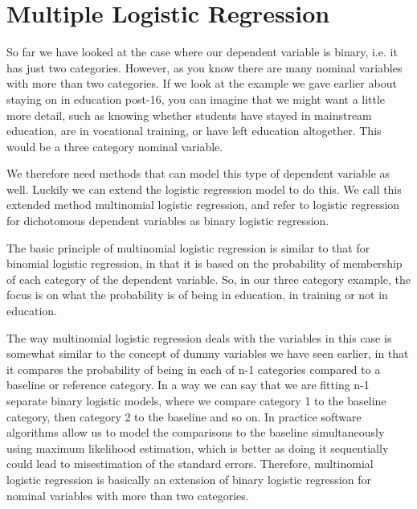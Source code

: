 \documentclass[a4paper,12pt]{article}
\begin{document}
\tableofcontents
\newpage


\section{Multiple Logistic Regression}
So far we have looked at the case where our dependent variable is binary, i.e. it has just two categories. However, as you know there are many nominal variables with more than two categories. If we look at the example we gave earlier about staying on in education post-16, you can imagine that we might want a little more detail, such as knowing whether students have stayed in mainstream education, are in vocational training, or have left education altogether. This would be a three category nominal variable.

We therefore need methods that can model this type of dependent variable as well. Luckily we can extend the logistic regression model to do this. We call this extended method multinomial logistic regression, and refer to logistic regression for dichotomous dependent variables as binary logistic regression.

The basic principle of multinomial logistic regression is similar to that for binomial logistic regression, in that it is based on the probability of membership of each category of the dependent variable. So, in our three category example, the focus is on what the probability is of being in education, in training or not in education.

The way multinomial logistic regression deals with the variables in this case is somewhat similar to the concept of dummy variables we have seen earlier, in that it compares the probability of being in each of n-1 categories compared to a baseline or reference category. In a way we can say that we are fitting n-1 separate binary logistic models, where we compare category 1 to the baseline category, then category 2 to the baseline and so on. In practice software algorithms allow us to model the comparisons to the baseline simultaneously using maximum likelihood estimation, which is better as doing it sequentially could lead to misestimation of the standard errors. Therefore, multinomial logistic regression is basically an extension of binary logistic regression for nominal variables with more than two categories. 
\end{document}

